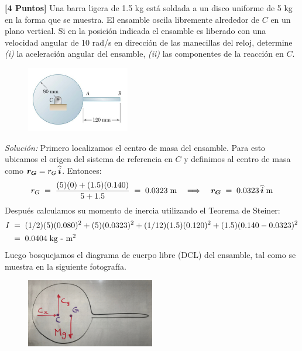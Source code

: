 \documentclass[ a4paper, twoside, 11pt]{article}
\begin{document}
\begin{problem}
\textbf{[4 Puntos]} Una barra ligera de 1.5 kg est\'a soldada a un disco uniforme de 5 kg en la forma que se muestra. El ensamble oscila libremente alrededor de $C$ en un plano vertical. Si en la posici\'on indicada el ensamble es liberado con una velocidad angular de 10 rad/s \linebreak en direcci\'on de las manecillas del reloj, determine \textit{(i)} la aceleraci\'on angular del ensamble, \linebreak \textit{(ii)} las componentes de la reacci\'on en $C$. 

\begin{figure}[htb]
\centering
\includegraphics[width=0.4\textwidth]{problema-2.jpg}
\end{figure}

\emph{Soluci\'on:} Primero localizamos el centro de masa del ensamble. Para esto ubicamos el origen del sistema de referencia en $C$ y definimos al centro de masa como ${\boldsymbol{r_G}} = r_G \, {\boldsymbol{\widehat{i}}}$. Entonces: 
\[
r_G \; = \; \frac{(5)(0) + (1.5)(0.140)}{5+1.5} \; = \;
0.0323 \; \text{m} \quad \Longrightarrow \quad
{\boldsymbol{r_G}} \; = \; 0.0323 \, {\boldsymbol{\widehat{i}}} \; \text{m}
\]
Despu\'es calculamos su momento de inercia utilizando el Teorema de Steiner: 
\begin{align*}
I \;
& = \; (1/2)(5)(0.080)^2 + (5)(0.0323)^2 + (1/12)(1.5)(0.120)^2 + (1.5)(0.140-0.0323)^2 \\
& = \; 0.0404 \; \text{kg - m\ensuremath{^{\text{2}}}}
\end{align*}
Luego bosquejamos el diagrama de cuerpo libre (DCL) del ensamble, tal como se muestra en la siguiente fotograf\'ia. 
\begin{figure}[htb]
\centering
\includegraphics[width=0.5\textwidth]{problema-2_DCL.jpg}
\end{figure}


\end{problem}
\end{document}
